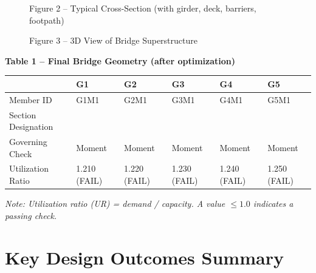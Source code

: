 \documentclass[12pt,a4paper]{report}
\numberwithin{table}{chapter}
\numberwithin{figure}{chapter}
\begin{document}
\newpage

\begin{figure}[H]
\centering
{}
\caption*{Figure 2 -- Typical Cross-Section (with girder, deck, barriers, footpath)}
\end{figure}

\begin{figure}[H]
\centering
{}
\caption*{Figure 3 -- 3D View of Bridge Superstructure}
\end{figure}

\noindent\textbf{Table 1 -- Final Bridge Geometry (after optimization)}

\vspace{0.4em}
\noindent
\begin{tabular}{|C{\arrayrulewidth\relax}|C{\arrayrulewidth\relax}|C{\arrayrulewidth\relax}|C{\arrayrulewidth\relax}|C{\arrayrulewidth\relax}|C{\arrayrulewidth\relax}|}
\hline
  \textbf{} &
  \textbf{G1} &
  \textbf{G2} &
  \textbf{G3} &
  \textbf{G4} &
  \textbf{G5} \\
\hline
Member ID & G1M1 & G2M1 & G3M1 & G4M1 & G5M1 \\
\hline
Section Designation &  &  &  &  &  \\
\hline
Governing Check & Moment & Moment & Moment & Moment & Moment \\
\hline
Utilization Ratio & 1.210 (FAIL) & 1.220 (FAIL) & 1.230 (FAIL) & 1.240 (FAIL) & 1.250 (FAIL) \\
\hline
\end{tabular}

\vspace{0.4em}
\noindent\textit{Note: Utilization ratio (UR) = demand / capacity. A value $\leq 1.0$ indicates a passing check.}

\vspace{1em}

\section*{Key Design Outcomes Summary}
\label{sec:key-outcomes}
\end{document}
